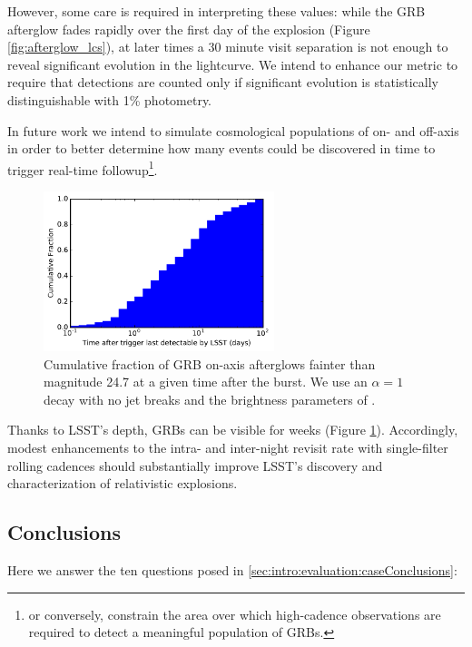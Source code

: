 However, some care is required in interpreting these values:
while the GRB afterglow fades rapidly over the first day of the explosion
(Figure \ref{fig:afterglow_lcs}), at later times a 30 minute visit
separation is not enough to reveal significant evolution in the lightcurve.
We intend to enhance our metric to require that detections are counted only
if significant evolution is statistically distinguishable with 1\%
photometry.

In future work we intend to simulate cosmological populations of on- and
off-axis in order to better determine how many events could be discovered
in time to trigger real-time followup\footnote{or conversely,
constrain the area
over which high-cadence observations are required to detect a meaningful
population of GRBs.}.

\begin{figure}[hbt]
\centerline{
\includegraphics[width=0.6\textwidth]{figs/transients/afterglow_cdf.pdf}
}
\caption{ Cumulative fraction of GRB on-axis afterglows fainter than
magnitude 24.7 at a given time after the burst. We use an $\alpha=1$
decay with no jet breaks and the brightness parameters of
\citet{2011PASP..123.1034J}. }
\label{fig:afterglow_visibility}
\end{figure}

Thanks to LSST's depth, GRBs can be visible for weeks (Figure
\ref{fig:afterglow_visibility}).  Accordingly,
modest enhancements to the intra- and inter-night revisit rate with
single-filter rolling cadences should substantially improve LSST's
discovery and characterization of relativistic explosions.


\subsection{Conclusions}

Here we answer the ten questions posed in
\autoref{sec:intro:evaluation:caseConclusions}:


